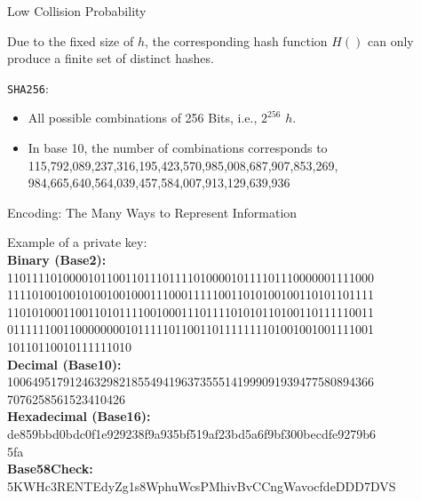 \documentclass[handout]{beamer}
\begin{document}
\begin{frame}{Low Collision Probability}

Due to the fixed size of $h$, the corresponding hash function $H()$ can only produce a finite set of distinct hashes.
\vspace{1em}

\texttt{SHA256}:
	\begin{itemize}
		\item All possible combinations of 256 Bits, i.e., $2^{256}$ $h$.
		\item In base 10, the number of combinations corresponds to 115,792,089,237,316,195,423,570,985,008,687,907,853,269,\\984,665,640,564,039,457,584,007,913,129,639,936
	\end{itemize}
\vspace{1em}

	
\end{frame}

\begin{frame}{Encoding: The Many Ways to Represent Information}

Example of a private key:
\\
\textbf{Binary (Base2):} 
11011110100001011001101110111101000010111101110000001111000 \\
11110100100101001001000111000111110011010100100110101101111 \\
11010100011001101011110010001110111101010110100110111110011 \\
01111110011000000001011111011001101111111101001001001111001 \\
10110110010111111010
\\ 
\textbf{Decimal (Base10):} 
10064951791246329821855494196373555141999091939477580894366 \\
7076258561523410426
\\
\textbf{Hexadecimal (Base16):} 
de859bbd0bdc0f1e929238f9a935bf519af23bd5a6f9bf300becdfe9279b6 \\
5fa
\\
\textbf{Base58Check:} 
5KWHc3RENTEdyZg1s8WphuWcsPMhivBvCCngWavocfdeDDD7DVS

\end{frame}
\end{document}
